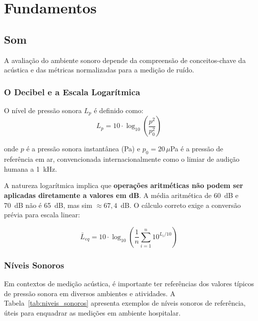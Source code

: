 \documentclass[12pt,a4paper]{report}
\begin{document}
\chapter{Fundamentos}

\section{Som}

A avaliação do ambiente sonoro depende da compreensão de conceitos-chave da acústica e das métricas normalizadas para a medição de ruído.

\subsection{O Decibel e a Escala Logarítmica}

O nível de pressão sonora $L_p$ é definido como:
\begin{equation}
L_p = 10 \cdot \log_{10}\!\left(\frac{p^2}{p_0^2}\right)
\label{eq:lp}
\end{equation}

onde $p$ é a pressão sonora instantânea (Pa) e $p_0 = 20\,\mu$Pa é a pressão de referência em ar, convencionada internacionalmente como o limiar de audição humana a 1~kHz.

A natureza logarítmica implica que \textbf{operações aritméticas não podem ser aplicadas diretamente a valores em dB}. A média aritmética de 60~dB e 70~dB não é 65~dB, mas sim $\approx 67{,}4$~dB. O cálculo correto exige a conversão prévia para escala linear:

\begin{equation}
\bar{L}_{eq} = 10 \cdot \log_{10}\!\left(\frac{1}{n}\sum_{i=1}^{n} 10^{L_i/10}\right)
\label{eq:media_db}
\end{equation}


\subsection{Níveis Sonoros}

Em contextos de medição acústica, é importante ter referências dos valores típicos de pressão sonora em diversos ambientes e atividades. A Tabela~\ref{tab:niveis_sonoros} apresenta exemplos de níveis sonoros de referência, úteis para enquadrar as medições em ambiente hospitalar.
\end{document}
